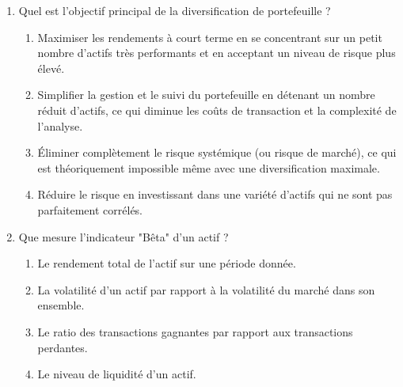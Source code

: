 \documentclass[a4paper,12pt]{article}
\begin{document}
\begin{enumerate}
    \item Quel est l'objectif principal de la diversification de portefeuille ?
    \begin{enumerate}[label=(\Alph*)]
        \item Maximiser les rendements à court terme en se concentrant sur un petit nombre d'actifs très performants et en acceptant un niveau de risque plus élevé.
        \item Simplifier la gestion et le suivi du portefeuille en détenant un nombre réduit d'actifs, ce qui diminue les coûts de transaction et la complexité de l'analyse.
        \item Éliminer complètement le risque systémique (ou risque de marché), ce qui est théoriquement impossible même avec une diversification maximale.
        \item Réduire le risque en investissant dans une variété d'actifs qui ne sont pas parfaitement corrélés.
    \end{enumerate}

    \item Que mesure l'indicateur "Bêta" d'un actif ?
    \begin{enumerate}[label=(\Alph*)]
        \item Le rendement total de l'actif sur une période donnée.
        \item La volatilité d'un actif par rapport à la volatilité du marché dans son ensemble.
        \item Le ratio des transactions gagnantes par rapport aux transactions perdantes.
        \item Le niveau de liquidité d'un actif.
    \end{enumerate}
    

\end{enumerate}
\end{document}
